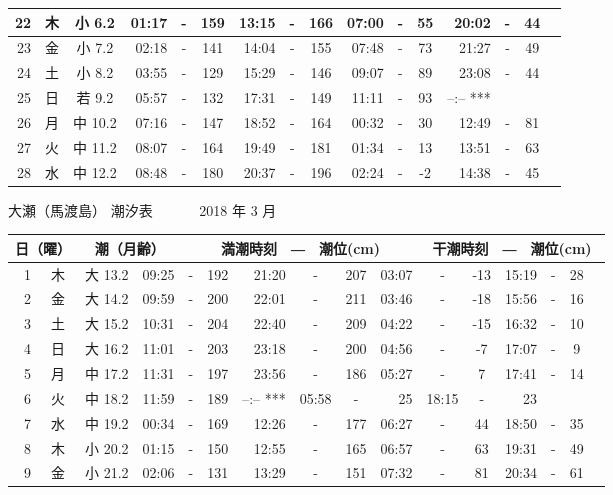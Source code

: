 \documentclass[12pt.a4j]{jsarticle}
\begin{document}
\begin{center}
\begin{table}[ht]
\begin{tabular}{|rc|cr|ccrccr|ccrccr|}
\hline
22 & 木 & 小  6.2 & 01:17 &-& 159 & 13:15 &-& 166 & 07:00 &-&  55 & 20:02 &-&  44 \\
\hline
23 & 金 & 小  7.2 & 02:18 &-& 141 & 14:04 &-& 155 & 07:48 &-&  73 & 21:27 &-&  49 \\
\hline
24 & 土 & 小  8.2 & 03:55 &-& 129 & 15:29 &-& 146 & 09:07 &-&  89 & 23:08 &-&  44 \\
\hline
25 & 日 & 若  9.2 & 05:57 &-& 132 & 17:31 &-& 149 & 11:11 &-&  93 & --:--   *** \\
\hline
26 & 月 & 中 10.2 & 07:16 &-& 147 & 18:52 &-& 164 & 00:32 &-&  30 & 12:49 &-&  81 \\
\hline
27 & 火 & 中 11.2 & 08:07 &-& 164 & 19:49 &-& 181 & 01:34 &-&  13 & 13:51 &-&  63 \\
\hline
28 & 水 & 中 12.2 & 08:48 &-& 180 & 20:37 &-& 196 & 02:24 &-&  -2 & 14:38 &-&  45 \\
\hline
\end{tabular}
\end{table}
\newpage
 {\LARGE 大瀬（馬渡島）  潮汐表　　　}
 {\large 2018 年  3 月}\\
 \begin{table}[ht]
 \begin{tabular}{|rc|cr|ccrccr|ccrccr|}
 \hline
 \multicolumn{2}{|c|}{日（曜）} & \multicolumn{2}{c|}{潮（月齢）} & \multicolumn{6}{c|}{満潮時刻　―　潮位(cm)} & \multicolumn{6}{c|}{干潮時刻　―　潮位(cm)} \\
 \hline
 1 & 木 & 大 13.2 & 09:25 &-& 192 & 21:20 &-& 207 & 03:07 &-& -13 & 15:19 &-&  28 \\
\hline
 2 & 金 & 大 14.2 & 09:59 &-& 200 & 22:01 &-& 211 & 03:46 &-& -18 & 15:56 &-&  16 \\
\hline
 3 & 土 & 大 15.2 & 10:31 &-& 204 & 22:40 &-& 209 & 04:22 &-& -15 & 16:32 &-&  10 \\
\hline
 4 & 日 & 大 16.2 & 11:01 &-& 203 & 23:18 &-& 200 & 04:56 &-&  -7 & 17:07 &-&   9 \\
\hline
 5 & 月 & 中 17.2 & 11:31 &-& 197 & 23:56 &-& 186 & 05:27 &-&   7 & 17:41 &-&  14 \\
\hline
 6 & 火 & 中 18.2 & 11:59 &-& 189 & --:--   *** & 05:58 &-&  25 & 18:15 &-&  23 \\
\hline
 7 & 水 & 中 19.2 & 00:34 &-& 169 & 12:26 &-& 177 & 06:27 &-&  44 & 18:50 &-&  35 \\
\hline
 8 & 木 & 小 20.2 & 01:15 &-& 150 & 12:55 &-& 165 & 06:57 &-&  63 & 19:31 &-&  49 \\
\hline
 9 & 金 & 小 21.2 & 02:06 &-& 131 & 13:29 &-& 151 & 07:32 &-&  81 & 20:34 &-&  61 \\

\end{tabular}
\end{table}
\end{center}
\end{document}
